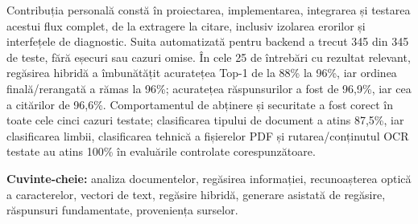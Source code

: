 Contribuția personală constă în proiectarea, implementarea, integrarea și testarea acestui flux complet, de la extragere la citare, inclusiv izolarea erorilor și interfețele de diagnostic. Suita automatizată pentru backend a trecut 345 din 345 de teste, fără eșecuri sau cazuri omise. În cele 25 de întrebări cu rezultat relevant, regăsirea hibridă a îmbunătățit acuratețea Top-1 de la 88\% la 96\%, iar ordinea finală/rerangată a rămas la 96\%; acuratețea răspunsurilor a fost de 96,9\%, iar cea a citărilor de 96,6\%. Comportamentul de abținere și securitate a fost corect în toate cele cinci cazuri testate; clasificarea tipului de document a atins 87,5\%, iar clasificarea limbii, clasificarea tehnică a fișierelor PDF și rutarea/conținutul OCR testate au atins 100\% în evaluările controlate corespunzătoare.

\begin{flushleft}
\textbf{Cuvinte-cheie:} analiza documentelor, regăsirea informației, recunoașterea optică a caracterelor, vectori de text, regăsire hibridă, generare asistată de regăsire, răspunsuri fundamentate, proveniența surselor.
\end{flushleft}

\endgroup
